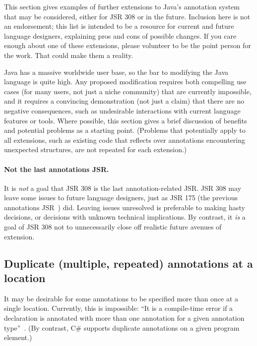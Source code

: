\documentclass[10pt]{article}
\begin{document}
This section gives examples of further extensions to Java's annotation
system that may be considered, either for JSR 308 or in the future.
Inclusion here is not an endorsement; this list is intended to be a
resource for current and future language designers, explaining pros and
cons of possible changes.
If you care enough about one of these extensions, please
volunteer to be the point person for the work.  That could make them a
reality.

Java has a massive worldwide user base, so the bar to modifying the Java
language is quite high.  Any proposed modification requires both compelling
use cases (for many users, not just a niche community) that are currently
impossible, and it requires a convincing demonstration (not just a claim)
that there are no negative consequences, such as undesirable interactions
with current language features or tools.  Where possible, this section
gives a brief discussion of benefits and potential problems as a starting
point.  (Problems that potentially apply to all extensions, such as
existing code that reflects over annotations encountering unexpected
structures, are not repeated for each extension.)


\paragraph{Not the last annotations JSR.}
It is \emph{not} a goal that JSR 308 is the last annotation-related JSR\@.
JSR 308 may leave some issues to future language designers, just as
JSR 175 (the previous annotations JSR~\cite{JSR175}) did.
Leaving issues unresolved is preferable to making hasty decisions, or
decisions with unknown technical implications.
By contrast, it \emph{is} a goal of JSR 308 not to unnecessarily close off
realistic future avenues of extension.



\subsection{Duplicate (multiple, repeated) annotations at a location\label{duplicate-annotations}}


It may be desirable for some
annotations to be
specified more than once at a single location.
Currently, this is impossible: ``It is a compile-time
error if a declaration is annotated with more than one annotation for a
given annotation type''~\cite[\S9.7]{GoslingJSB2005}.
(By contrast, C\# supports duplicate annotations on a given program element.)
\end{document}
